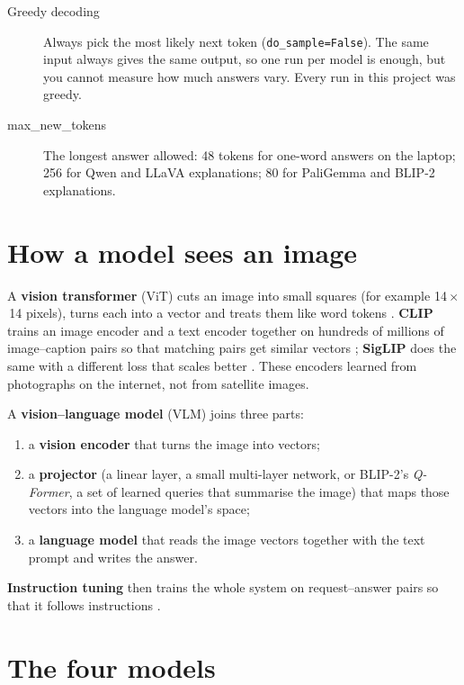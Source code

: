 \begin{description}
  \item[Greedy decoding] Always pick the most likely next token (\texttt{do\_sample=False}). The same input always gives the same output, so one run per model is enough, but you cannot measure how much answers vary. Every run in this project was greedy.
  \item[max\_new\_tokens] The longest answer allowed: 48 tokens for one-word answers on the laptop; 256 for Qwen and LLaVA explanations; 80 for PaliGemma and BLIP-2 explanations.
\end{description}

\section{How a model sees an image}

A \textbf{vision transformer} (ViT) cuts an image into small squares (for example 14\,$\times$\,14 pixels), turns each into a vector and treats them like word tokens \citep{dosovitskiy2021}. \textbf{CLIP} trains an image encoder and a text encoder together on hundreds of millions of image--caption pairs so that matching pairs get similar vectors \citep{radford2021}; \textbf{SigLIP} does the same with a different loss that scales better \citep{zhai2023}. These encoders learned from photographs on the internet, not from satellite images.

A \textbf{vision--language model} (VLM) joins three parts:
\begin{enumerate}
  \item a \textbf{vision encoder} that turns the image into vectors;
  \item a \textbf{projector} (a linear layer, a small multi-layer network, or BLIP-2's \emph{Q-Former}, a set of learned queries that summarise the image) that maps those vectors into the language model's space;
  \item a \textbf{language model} that reads the image vectors together with the text prompt and writes the answer.
\end{enumerate}
\textbf{Instruction tuning} then trains the whole system on request--answer pairs so that it follows instructions \citep{liu2023llava,liu2024llava15}.

\section{The four models}

